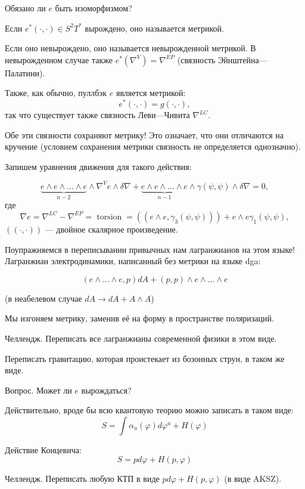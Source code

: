 \documentclass[11pt]{article}
\def\ph{\varphi}
\theoremstyle{remark}
\theoremstyle{definition}
\begin{document}
Обязано ли $e$ быть изоморфизмом?

Если $e^* (\cdot,\cdot) \in S^2 T^*$ вырождено, оно называется метрикой.

Если оно невырождено, оно называется невырожденной метрикой. В невырожденном случае также $e^* (\nabla^V) = \nabla^{EP}$ (связность Эйнштейна---Палатини).

Также, как обычно, пуллбэк $e$ является метрикой: $$e^* (\cdot,\cdot) = g(\cdot, \cdot),$$ так что существует также связность Леви---Чивита $\nabla^{LC}.$

Обе эти связности сохраняют метрику! Это означает, что они отличаются на кручение (условием сохранения метрики связность не определяется однозначно).

Запишем уравнения движения для такого действия:

$$ \underbrace{e \wedge e \wedge ... \wedge e}_{n-2} \wedge \nabla^V e \wedge \delta \nabla + \underbrace{e \wedge e \wedge ... \wedge e}_{n-1} \wedge \gamma(\psi, \psi) \wedge \delta \nabla = 0,  $$ где
$$\nabla e = \nabla^{LC} - \nabla^{EP} = \operatorname{torsion} = ((e\wedge e, \gamma_3 (\psi, \psi) )) + e \wedge e \gamma_1 (\psi, \psi),$$ $((\cdot,\cdot))$ --- двойное скалярное произведение.

Поупражняемся в переписывании привычных нам лагранжианов на этом языке! Лагранжиан электродинамики, написанный без метрики на языке dga:

$$(e \wedge ... \wedge e, p) dA + (p,p) \wedge e \wedge ... \wedge e$$

(в неабелевом случае $dA \to dA + A \wedge A$)

Мы изгоняем метрику, заменив её на форму в пространстве поляризаций.

\footnotesize{}
Челлендж. Переписать все лагранжианы современной физики в этом виде.

Переписать гравитацию, которая проистекает из бозонных струн, в таком же виде.

Вопрос. Может ли $e$ вырождаться?
\normalsize{}

Действительно, вроде бы всю квантовую теорию можно записать в таком виде:
$$S = \int \alpha_a (\ph) d\ph^a + H(\ph)$$

Действие Концевича: $$S = p d\ph + H(p, \ph)$$

\footnotesize{}
Челлендж. Переписать любую КТП в виде $p d\ph + H(p, \ph)$ (в виде AKSZ).
\normalsize{}

\bigskip
\bigskip


 
\end{document}
